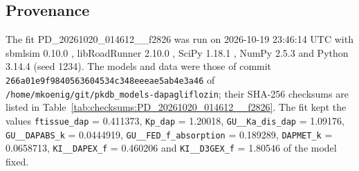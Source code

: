 \subsection{Provenance}

The fit PD\_20261020\_014612\_\_f2826 was run on 2026-10-19 23:46:14 UTC with sbmlsim 0.10.0 \cite{Koenig2026_sbmlsim}, libRoadRunner 2.10.0 \cite{Welsh2023}, SciPy 1.18.1 \cite{Virtanen2020}, NumPy 2.5.3 \cite{Harris2020} and Python 3.14.4 (seed 1234). The models and data were those of commit \texttt{266a01e9f9840563604534c348eeeae5ab4e3a46} of \texttt{/home/mkoenig/git/pkdb\_models-dapagliflozin}; their SHA-256 checksums are listed in Table~\ref{tab:checksums:PD_20261020_014612__f2826}. The fit kept the values \texttt{ftissue\_dap} = 0.411373, \texttt{Kp\_dap} = 1.20018, \texttt{GU\_\_Ka\_dis\_dap} = 1.09176, \texttt{GU\_\_DAPABS\_k} = 0.0444919, \texttt{GU\_\_FED\_f\_absorption} = 0.189289, \texttt{DAPMET\_k} = 0.0658713, \texttt{KI\_\_DAPEX\_f} = 0.460206 and \texttt{KI\_\_D3GEX\_f} = 1.80546 of the model fixed.


